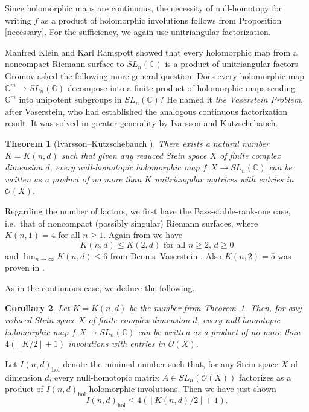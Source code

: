 \documentclass{amsart}
\newcommand{\C}{\mathbb{C}}
\newcommand{\hol}{\mathrm{hol}}
\newcommand{\holo}{\mathcal{O}}
\newtheorem{Thm}{Theorem}[section]
\newtheorem{Cor}[Thm]{Corollary}
\theoremstyle{definition}
\begin{document}
Since holomorphic maps are continuous, the necessity of null-homotopy for writing $f$ as a product of holomorphic involutions follows from Proposition \ref{necessary}. For the sufficiency, we again use unitriangular factorization.


Manfred Klein and Karl Ramspott \cite[\S IV]{MR0966022} showed that every holomorphic map from a noncompact Riemann surface to $SL_n(\C)$ is a product of unitriangular factors. 
Gromov \cite{MR1001851} asked the following more general question: Does every holomorphic map $\C^m \to SL_n(\C)$ decompose into a finite product of holomorphic maps sending $\C^m$ into unipotent subgroups in $SL_n(\C)$?
He named it {\it the Vaserstein Problem}, after Vaserstein, who had established the analogous continuous factorization result. It was solved in greater generality by Ivarsson and Kutzschebauch. 

\begin{Thm}[Ivarsson--Kutzschebauch \cite{MR2874639}]\label{IK-SL}
    There exists a natural
    number $K = K(n, d)$ such that given any  reduced Stein space $X$ of finite complex dimension $d$, every null-homotopic holomorphic map $f : X \to SL_n(\C)$ can be written as a product of no more than $K$ unitriangular matrices with entries in $\holo (X)$. 
\end{Thm}
Regarding the number of factors, we first have the Bass-stable-rank-one case, i.e.\ that of noncompact (possibly singular) Riemann surfaces, where $K(n,1)=4$ for all $n \ge 1$. Again  from \cite{MR0961333} we have 
\[
    K(n,d) \le K(2,d) \text{ for all } n \ge 2, \, d \ge 0 
\]
and $\displaystyle\lim_{n \to \infty} K(n,d) \le 6$ from Dennis--Vaserstein \cite[Theorem 20]{MR0961333}. 
Also $K(n,2)=5$ was proven in \cite{MR2869067}.

As in the continuous case, we deduce the following.
\begin{Cor}
 Let $K= K(n,d)$   be the number from  Theorem~\ref{IK-SL}. Then, for
 any reduced Stein space $X$ of finite complex dimension $d$, every null-homotopic holomorphic map $f : X \to SL_n(\C)$ can be written as a product of no more than  $4 (\left\lfloor K/2  \right\rfloor+ 1)$ involutions  with entries in $\holo (X)$.
 \end{Cor}

Let $I(n,d)_{\hol}$ denote the minimal number such that, for any Stein space $X$ of dimension $d$, every null-homotopic matrix 
$A \in SL_n (\holo (X))$ factorizes as a product of $I(n,d)_{\hol}$ holomorphic involutions. Then we have just shown $$I(n,d)_{\hol} \le 4 (\left\lfloor K(n,d)/2  \right\rfloor+ 1).$$
\end{document}
